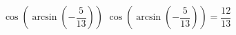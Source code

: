  {$\cos\left(\arcsin\left(-\dfrac{5}{13}\right)\right)$}
{ $\cos\left(\arcsin\left(-\dfrac{5}{13}\right)\right) = \dfrac{12}{13}$}
